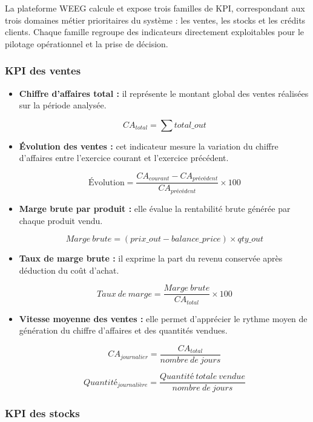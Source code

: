 \documentclass[a4paper,12pt]{report}
\begin{document}
La plateforme WEEG calcule et expose trois familles de KPI, correspondant aux
trois domaines métier prioritaires du système : les ventes, les stocks et les
crédits clients. Chaque famille regroupe des indicateurs directement exploitables
pour le pilotage opérationnel et la prise de décision.

\subsubsection{KPI des ventes}

\begin{itemize}
    \item \textbf{Chiffre d'affaires total :} il représente le montant global des
    ventes réalisées sur la période analysée.

    \[
        CA_{total} = \sum total\_out
    \]

    \item \textbf{Évolution des ventes :} cet indicateur mesure la variation du
    chiffre d'affaires entre l'exercice courant et l'exercice précédent.

    \[
        \text{Évolution} = \frac{CA_{courant} - CA_{précédent}}{CA_{précédent}} \times 100
    \]

    \item \textbf{Marge brute par produit :} elle évalue la rentabilité brute
    générée par chaque produit vendu.

    \[
        Marge\ brute = (prix\_out - balance\_price) \times qty\_out
    \]

    \item \textbf{Taux de marge brute :} il exprime la part du revenu conservée
    après déduction du coût d'achat.

    \[
        Taux\ de\ marge = \frac{Marge\ brute}{CA_{total}} \times 100
    \]

    \item \textbf{Vitesse moyenne des ventes :} elle permet d'apprécier le rythme
    moyen de génération du chiffre d'affaires et des quantités vendues.

    \[
        CA_{journalier} = \frac{CA_{total}}{nombre\ de\ jours}
    \]

    \[
        Quantité_{journalière} = \frac{Quantité\ totale\ vendue}{nombre\ de\ jours}
    \]
\end{itemize}

\subsubsection{KPI des stocks}
\end{document}
